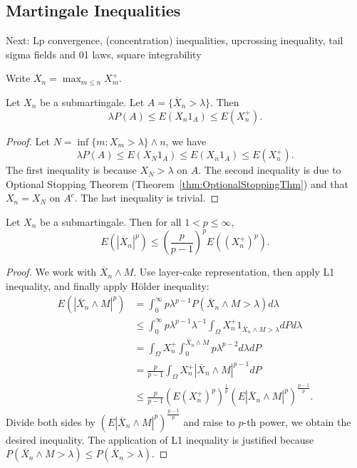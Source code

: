 \subsection{Martingale Inequalities}
Next: Lp convergence, (concentration) inequalities, upcrossing inequality, tail sigma fields and  01 laws, square integrability

Write $\overline{X} _n = \max_{m \le n} X_m^+$.
\begin{theorem}
	\label{thm:DooblInequality}
	Let $X_n$ be a submartingale. Let $A = \{\overline{X} _n > \lambda\} $. Then
	\[
		\lambda P(A) \le E\left( X_n 1_A \right) \le E(X_n^+)
	.\] 
\end{theorem}
\begin{proof}
	Let $N = \inf \{m: X_m > \lambda\} \wedge n$, we have
	\[
		\lambda P(A) \le E(X_N 1_A) \le E(X_n 1_A) \le E(X_n^+)
	.\] 
	The first inequality is because $X_N > \lambda$ on $A$. The second inequality is due to Optional Stopping Theorem (Theorem~\ref{thm:OptionalStoppingThm}) and that $X_n = X_N$ on $A^c$. The last inequality is trivial.
\end{proof}

\begin{theorem}
	\label{thm:DooblpMaximalInequality}
	Let $X_n$ be a submartingale. Then for all $1 < p \le \infty $,
	\[
		E\left( |\overline{X} _n|^p \right) 
		\le 
		\left( \frac{p}{p-1} \right)^p
		E\left( (X_n^+)^p \right) 
	.\] 
\end{theorem}
\begin{proof}
	We work with $\overline{X} _n \wedge M$. Use layer-cake representation, then apply L1 inequality, and finally apply H\"older inequality:
	\begin{align*}
		E\left( |\overline{X} _n \wedge M|^p \right) 
		&= \int _0^\infty p \lambda^{p - 1} P\left(  \overline{X} _n \wedge M > \lambda \right) d \lambda  \\
		&\le  \int _0^\infty p \lambda^{p - 1} \lambda^{-1} \int _\Omega X_n^+ 1_{\overline{X} _n \wedge M > \lambda} dP d\lambda  \\
		&= \int _\Omega X_n^+ \int _0^{\overline{X} _n \wedge M}  p \lambda^{p - 2} d\lambda dP \\
		&= \frac{p}{p - 1} \int _\Omega X_n^+ |\overline{X} _n \wedge M|^{p - 1} dP \\
		&\leq \frac{p}{p - 1} (E (X_n^+)^p)^{\frac{1}{p}} (E|\overline{X} _n \wedge M|^{p})^{\frac{p - 1}{p}} 
	.\end{align*}
	Divide both sides by $(E|\overline{X} _n \wedge M|^{p})^{\frac{p - 1}{p}}$ and raise to $p$-th power, we obtain the desired inequality.
	The application of L1 inequality is justified because $P(\overline{X} _n \wedge M > \lambda) \le P (\overline{X} _n > \lambda)$.
\end{proof}









